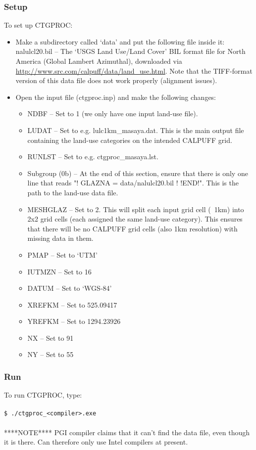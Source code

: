 \documentclass[10pt,a4paper]{article}
\newcommand\tab[1][0.5cm]{\hspace*{#1}}
\begin{document}
\subsubsection{Setup}
To set up CTGPROC:
\begin{itemize}
\item Make a subdirectory called `data' and put the following file inside it:
nalulcl20.bil -- The `USGS Land Use/Land Cover' BIL format file for North America (Global Lambert Azimuthal), downloaded via \url{http://www.src.com/calpuff/data/land_use.html}. Note that the TIFF-format version of this data file does not work properly (alignment issues).
\item Open the input file (ctgproc.inp) and make the following changes:
\begin{itemize}
\item NDBF -- Set to 1 (we only have one input land-use file).
\item LUDAT -- Set to e.g. lulc1km\_masaya.dat. This is the main output file containing the land-use categories on the intended CALPUFF grid.
\item RUNLST -- Set to e.g. ctgproc\_masaya.lst.
\item Subgroup (0b) -- At the end of this section, ensure that there is only one line that reads "! GLAZNA  =  data/nalulcl20.bil !  !END!". This is the path to the land-use data file.
\item MESHGLAZ -- Set to 2. This will split each input grid cell (~1km) into 2x2 grid cells (each assigned the same land-use category). This ensures that there will be no CALPUFF grid cells (also 1km resolution) with missing data in them.
\item PMAP -- Set to `UTM'
\item IUTMZN -- Set to 16
\item DATUM -- Set to `WGS-84'
\item XREFKM -- Set to 525.09417
\item YREFKM -- Set to 1294.23926
\item NX -- Set to 91
\item NY -- Set to 55
\end{itemize}
\end{itemize}

\subsubsection{Run}
To run CTGPROC, type:\\\\
\tab \texttt{\$ ./ctgproc\_<compiler>.exe}\\\\
****NOTE**** PGI compiler claims that it can't find the data file, even though it is there. Can therefore only use Intel compilers at present.
\end{document}

